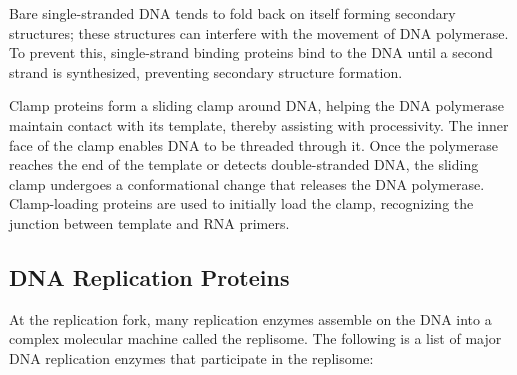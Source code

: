 Bare single-stranded DNA tends to fold back on itself forming secondary structures; these structures can interfere with the movement of DNA polymerase. To prevent this, single-strand binding proteins bind to the DNA until a second strand is synthesized, preventing secondary structure formation.

Clamp proteins form a sliding clamp around DNA, helping the DNA polymerase maintain contact with its template, thereby assisting with processivity. The inner face of the clamp enables DNA to be threaded through it. Once the polymerase reaches the end of the template or detects double-stranded DNA, the sliding clamp undergoes a conformational change that releases the DNA polymerase. Clamp-loading proteins are used to initially load the clamp, recognizing the junction between template and RNA primers.

\hypertarget{dna-replication-proteins}{%
\subsection{DNA Replication Proteins}\label{dna-replication-proteins}}

At the replication fork, many replication enzymes assemble on the DNA into a complex molecular machine called the replisome. The following is a list of major DNA replication enzymes that participate in the replisome:

